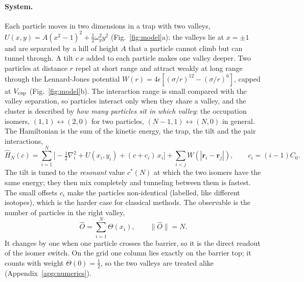 \paragraph{System.}
Each particle moves in two dimensions in a trap with two valleys, $U(x,y)=A(x^2-1)^2+\tfrac12\omega_y^2y^2$ (Fig.~\ref{fig:model}a): the valleys lie at $x=\pm1$ and are separated
by a hill of height $A$ that a particle cannot climb but can tunnel through. A tilt $c\,x$ added to each particle makes one valley deeper. Two particles at
distance $r$ repel at short range and attract weakly at long range through the Lennard-Jones potential $W(r)=4\epsilon[(\sigma/r)^{12}-(\sigma/r)^{6}]$, capped at $V_{\rm cap}$
(Fig.~\ref{fig:model}b). The interaction range is small compared with the valley separation, so particles interact only
when they share a valley, and the cluster is described by \emph{how many particles sit in which valley}: the occupation isomers,
$(1,1)\leftrightarrow(2,0)$ for two particles, $(N-1,1)\leftrightarrow(N,0)$ in general. The Hamiltonian is the sum of the kinetic energy, the trap, the tilt and the pair interactions,
\begin{equation}
\hat H_N(c)=\sum_{i=1}^{N}\Big[-\tfrac12\nabla_i^{2}+U(x_i,y_i)+(c+c_i)\,x_i\Big]+\sum_{i<j}W(|\mathbf r_i-\mathbf r_j|),
\qquad c_i=(i-1)C_0 .
\label{eq:HN}
\end{equation}
The tilt is tuned to the \emph{resonant} value $c^*(N)$ at which the two isomers have the same energy; they then mix completely and tunneling between them is fastest. The small offsets $c_i$ make
the particles non-identical (labelled, like different isotopes), which is the harder case for classical methods. The observable is the number of particles in the right valley,
\begin{equation}
\hat O=\sum_{i=1}^{N}\Theta(x_i),\qquad \|\hat O\|=N .
\label{eq:Oobs}
\end{equation}
It changes by one when one particle crosses the barrier, so it is the direct readout of the isomer switch. On the grid one column lies exactly on the barrier top; it counts with weight $\Theta(0)=\tfrac12$, so the two valleys are treated alike (Appendix~\ref{app:numerics}).

